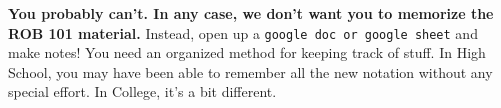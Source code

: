  \vspace*{.5cm}
\begin{tcolorbox}[title={\large \textcolor{red}{\bf  Help! Help! } \textbf{ How am I supposed to remember all of this?}}]
 
\textbf{ You probably can't. In any case, we don't want you to memorize the ROB 101 material.} Instead, open up a \texttt{google doc or google sheet} and make notes! You need an organized method for keeping track of stuff. In High School, you may have been able to remember all the new notation without any special effort. In College, it's a bit different.
 
 \end{tcolorbox}

